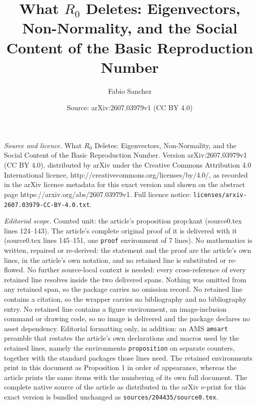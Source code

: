 \documentclass[10pt,a4paper]{amsart}
\title{What \texorpdfstring{$R_0$}{R0} Deletes: Eigenvectors, Non-Normality, and the Social Content of the Basic Reproduction Number}
\author{Fabio Sanchez}
\date{Source: arXiv:2607.03979v1 (CC BY 4.0)}
\begin{document}
\maketitle

\noindent\emph{Source and licence.} What \texorpdfstring{$R_0$}{R0} Deletes: Eigenvectors, Non-Normality, and the Social Content of the Basic Reproduction Number. Version arXiv:2607.03979v1 (CC BY 4.0), distributed by arXiv under the Creative Commons Attribution 4.0 International licence, http://creativecommons.org/licenses/by/4.0/, as recorded in the arXiv licence metadata for this exact version and shown on the abstract page https://arxiv.org/abs/2607.03979v1. Full licence notice: \texttt{licenses/arxiv-2607.03979-CC-BY-4.0.txt}.\par\smallskip

\noindent\textit{Editorial scope.} Counted unit: the article's proposition prop:kant (source0.tex lines 124--143). The article's complete original proof of it is delivered with it (source0.tex lines 145--151, one \texttt{proof} environment of 7 lines). No mathematics is written, repaired or re-derived: the statement and the proof are the article's own lines, in the article's own notation, and no retained line is substituted or re-flowed.  No further source-local context is needed: every cross-reference of every retained line resolves inside the two delivered spans.  Nothing was omitted from any retained span, so the package carries no omission record.  No retained line contains a citation, so the wrapper carries no bibliography and no bibliography entry.  No retained line contains a figure environment, an image-inclusion command or drawing code, so no image is delivered and the package declares no asset dependency.  Editorial formatting only, in addition: an AMS \texttt{amsart} preamble that restates the article's own declarations and macros used by the retained lines, namely the environments \texttt{proposition} on separate counters, together with the standard packages those lines need.  The retained environments print in this document as Proposition 1 in order of appearance, whereas the article prints the same items with the numbering of its own full document.  The complete native source of the article as distributed in the arXiv e-print for this exact version is bundled unchanged as \texttt{sources/204435/source0.tex}.
\end{document}
